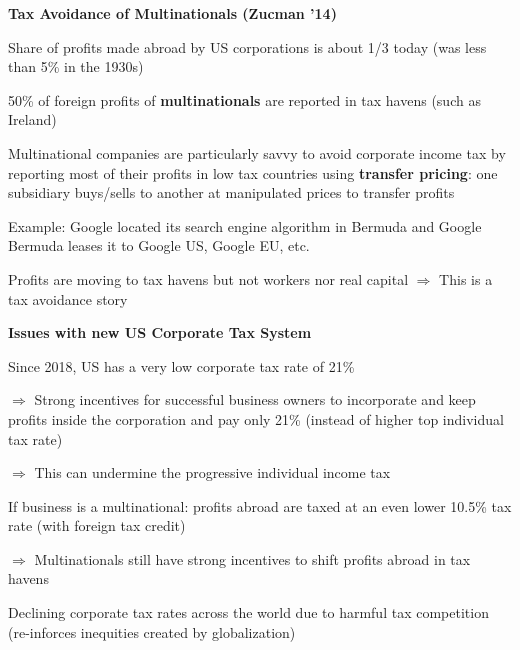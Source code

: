 \documentclass[landscape]{slides}
\begin{document}
\begin{slide}
\begin{center}
{\bf Tax Avoidance of Multinationals (Zucman '14)}
\end{center}
Share of profits made abroad by US corporations is about 1/3 today (was less than 5\% in the 1930s)

50\% of foreign profits of \textbf{multinationals} are reported in tax havens (such as Ireland)


Multinational companies are particularly savvy to avoid corporate income tax
by reporting most of their profits in low tax countries using \textbf{transfer pricing}: one subsidiary buys/sells to another
at manipulated prices to transfer profits

Example: Google located its search engine algorithm in Bermuda and Google Bermuda leases it to Google US, Google EU, etc.

Profits are moving to tax havens but not workers nor real capital $\Rightarrow$ This is a tax avoidance story



\end{slide}

\begin{slide}

\end{slide}

\begin{slide}

\end{slide}

\begin{slide}
\begin{center}
{\bf Issues with new US Corporate Tax System}
\end{center}
Since 2018, US has a very low corporate tax rate of 21\%

$\Rightarrow$ Strong incentives for successful business owners to incorporate 
and keep profits inside the corporation and pay only 21\% (instead of higher top individual tax rate)

$\Rightarrow$ This can undermine the progressive individual income tax

If business is a multinational: profits abroad are taxed at an even lower 10.5\% tax rate (with foreign tax credit)

$\Rightarrow$ Multinationals still have strong incentives to shift profits abroad in tax havens

Declining corporate tax rates across the world due to harmful tax competition (re-inforces inequities created by globalization)

\end{slide}
\end{document}
